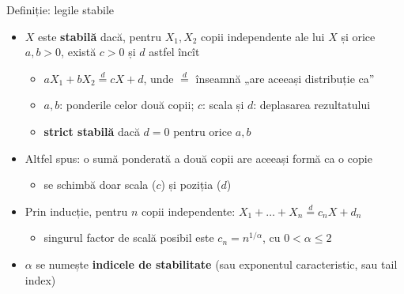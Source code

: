\begin{frame}{Definiție: legile stabile}
\itemsize{\small}
\begin{itemize}
    \item $X$ este \textbf{stabilă} dacă, pentru $X_1, X_2$ copii independente ale lui $X$ și orice $a, b > 0$, există $c > 0$ și $d$ astfel încît
    \begin{itemize}
        \item $aX_1 + bX_2 \overset{d}{=} cX + d$, unde $\overset{d}{=}$ înseamnă „are aceeași distribuție ca”
        \item $a, b$: ponderile celor două copii; $c$: scala și $d$: deplasarea rezultatului
        \item \textbf{strict stabilă} dacă $d = 0$ pentru orice $a, b$
    \end{itemize}
    \item Altfel spus: o sumă ponderată a două copii are aceeași formă ca o copie
    \begin{itemize}
        \item se schimbă doar scala ($c$) și poziția ($d$)
    \end{itemize}
    \item Prin inducție, pentru $n$ copii independente: $X_1 + \dots + X_n \overset{d}{=} c_n X + d_n$
    \begin{itemize}
        \item singurul factor de scală posibil este $c_n = n^{1/\alpha}$, cu $0 < \alpha \le 2$ 
    \end{itemize}
    \item $\alpha$ se numește \textbf{indicele de stabilitate} (sau exponentul caracteristic, sau tail index)
\end{itemize}
\end{frame}

